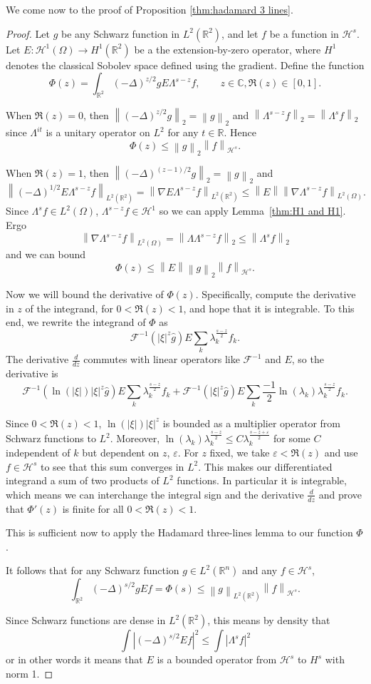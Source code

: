 \documentclass[11pt]{amsart}
\theoremstyle{remark}
\theoremstyle{definition}
\newcommand{\R}{\mathbb{R}}
\newcommand{\C}{\mathbb{C}}
\newcommand{\Four}{\mathcal{F}}
\newcommand{\eps}{\varepsilon}
\newcommand{\norm}[1]{\left\lVert#1\right\rVert}
\newcommand{\paren}[1]{\left( #1 \right)}
\newcommand{\abs}[1]{\left\lvert #1 \right\rvert}
\newcommand{\grad}{\nabla}
\newcommand{\Laplace}{\Delta}
\newcommand{\ddz}{\frac{d}{dz}}
\newcommand{\n}{^{-1}}
\newcommand{\HD}{\mathcal{H}}
\begin{document}
We come now to the proof of Proposition \ref{thm:hadamard 3 lines}.  
\begin{proof}
Let $g$ be any Schwarz function in $L^2(\R^2)$, and let $f$ be a function in $\HD^s$.  Let $E:\HD^1(\Omega) \to H^1(\R^2)$ be a the extension-by-zero operator, where $H^1$ denotes the classical Sobolev space defined using the gradient.  Define the function
\[ \Phi(z) = \int_{\R^2} \paren{-\Laplace}^{z/2} g E \Lambda^{s-z} f, \qquad z \in \C, \Re(z) \in [0,1]. \]

When $\Re(z) = 0$, then $\norm{\paren{-\Laplace}^{z/2} g}_2 = \norm{g}_2$ and $\norm{\Lambda^{s-z} f}_2 = \norm{\Lambda^s f}_2$ since $\Lambda^{i t}$ is a unitary operator on $L^2$ for any $t \in \R$.  Hence
\[ \Phi(z) \leq \norm{g}_2 \norm{f}_{\HD^s}. \]

When $\Re(z)=1$, then $\norm{\paren{-\Laplace}^{(z-1)/2} g}_2 = \norm{g}_2$ and 
\[ \norm{\paren{-\Laplace}^{1/2} E\Lambda^{s-z} f}_{L^2(\R^2)} = \norm{\grad E \Lambda^{s-z} f}_{L^2(\R^2)} \leq \norm{E} \norm{\grad \Lambda^{s-z} f}_{L^2(\Omega)}. \]
Since $\Lambda^s f \in L^2(\Omega)$, $\Lambda^{s-z} f \in \HD^1$ so we can apply Lemma~\ref{thm:H1 and H1}.  Ergo
\[ \norm{\grad \Lambda^{s-z} f}_{L^2(\Omega)} = \norm{\Lambda \Lambda^{s-z} f}_2 \leq \norm{\Lambda^s f}_2 \]
and we can bound
\[ \Phi(z) \leq \norm{E} \norm{g}_2 \norm{f}_{\HD^s}. \]

Now we will bound the derivative of $\Phi(z)$.  Specifically, compute the derivative in $z$ of the integrand, for $0<\Re(z)<1$, and hope that it is integrable.  To this end, we rewrite the integrand of $\Phi$ as
\[ \Four\n\paren{ |\xi|^z \hat{g} } E \sum_k \lambda_k^{\frac{s-z}{2}} f_k. \]
The derivative $\ddz$ commutes with linear operators like $\Four\n$ and $E$, so the derivative is
\[ \Four\n\paren{ \ln(|\xi|) |\xi|^z \hat{g} } E \sum_k \lambda_k^{\frac{s-z}{2}} f_k + \Four\n\paren{ |\xi|^z \hat{g} } E \sum_k \frac{-1}{2} \ln(\lambda_k) \lambda_k^{\frac{s-z}{2}} f_k. \]

Since $0<\Re(z)<1$, $\ln(|\xi|)|\xi|^z$ is bounded as a multiplier operator from Schwarz functions to $L^2$.  Moreover, $\ln(\lambda_k) \lambda_k^{\frac{s-z}{2}} \leq C \lambda_k^{\frac{s-z+\eps}{2}}$ for some $C$ independent of $k$ but dependent on $z$, $\eps$.  For $z$ fixed, we take $\eps < \Re(z)$ and use $f \in \HD^{s}$ to see that this sum converges in $L^2$.  This makes our differentiated integrand a sum of two products of $L^2$ functions.  In particular it is integrable, which means we can interchange the integral sign and the derivative $\ddz$ and prove that $\Phi'(z)$ is finite for all $0<\Re(z)<1$. 

This is sufficient now to apply the Hadamard three-lines lemma to our function $\Phi$.  

It follows that for any Schwarz function $g \in L^2(\R^n)$ and any $f \in \HD^{s}$,
\[ \int_{\R^2} \paren{-\Laplace}^{s/2} g E f = \Phi(s) \leq \norm{g}_{L^2(\R^2)} \norm{f}_{\HD^s}. \]

Since Schwarz functions are dense in $L^2(\R^2)$, this means by density that 
\[ \int \abs{ \paren{-\Laplace}^{s/2} E f }^2 \leq \int \abs{\Lambda^s f}^2 \]
or in other words it means that $E$ is a bounded operator from $\HD^s$ to $H^s$ with norm 1.  
\end{proof}
\end{document}
